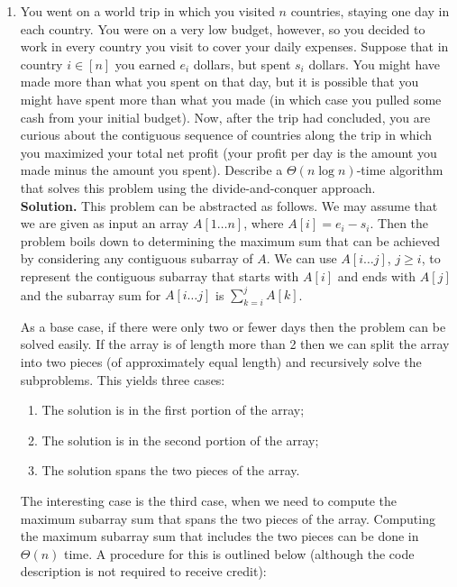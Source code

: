 \documentclass[11pt]{article}
\begin{document}
\begin{enumerate}

\item You went on a world trip in which you visited $n$ countries, staying one day in each country. You were on a very low budget, however, so you decided to work in every country you visit to cover your daily expenses. Suppose that in country $i \in [n]$ you earned $e_{i}$ dollars, but spent $s_{i}$ dollars. You might have made more than what you spent on that day, but it is possible that you might have spent more than what you made (in which case you pulled some cash from your initial budget). Now, after the trip had concluded, you are curious about the contiguous sequence of countries along the trip in which you maximized your total net profit (your profit per day is the amount you made minus the amount you spent). Describe a $\Theta(n \log{n})$-time algorithm that solves this problem using the divide-and-conquer approach. \\

{\bf Solution.}  This problem can be abstracted as follows. We may assume that we are given as input an array $A[1 \dots n]$, where $A[i] = e_{i} - s_{i}$. Then the problem boils down to determining the maximum sum that can be achieved by considering any contiguous subarray of $A$. We can use $A[i \dots j]$, $ j \ge i$, to represent the contiguous subarray that starts with $A[i]$ and ends with $A[j]$ and the subarray sum for $A[i \dots j]$ is $\sum_{k=i}^{j} A[k]$. 
 
As a base case, if there were only two or fewer days then the problem can be solved easily. If the array is of length more than 2 then we can split the array into two pieces (of approximately equal length) and recursively solve the subproblems. This yields three cases:
		\begin{enumerate}
			\item The solution is in the first portion of the array;
			\item The solution is in the second portion of the array;
			\item The solution spans the two pieces of the array.
		\end{enumerate}
		The interesting case is the third case, when we need to compute the maximum subarray sum that spans the two pieces of the array. Computing the maximum subarray sum that includes the two pieces can be done in $\Theta(n)$ time.
		A procedure for this is outlined below (although the code description is not required to receive credit):
		


\end{enumerate}
\end{document}
